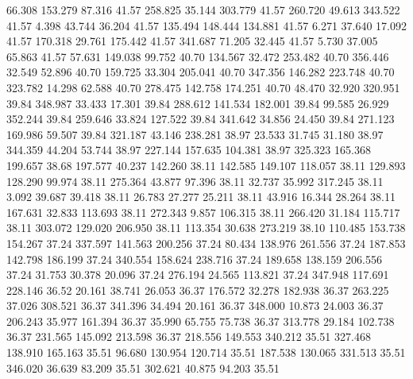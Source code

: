   66.308  153.279   87.316        41.57
 258.825   35.144  303.779        41.57
 260.720   49.613  343.522        41.57
   4.398   43.744   36.204        41.57
 135.494  148.444  134.881        41.57
   6.271   37.640   17.092        41.57
 170.318   29.761  175.442        41.57
 341.687   71.205   32.445        41.57
   5.730   37.005   65.863        41.57
  57.631  149.038   99.752        40.70
 134.567   32.472  253.482        40.70
 356.446   32.549   52.896        40.70
 159.725   33.304  205.041        40.70
 347.356  146.282  223.748        40.70
 323.782   14.298   62.588        40.70
 278.475  142.758  174.251        40.70
  48.470   32.920  320.951        39.84
 348.987   33.433   17.301        39.84
 288.612  141.534  182.001        39.84
  99.585   26.929  352.244        39.84
 259.646   33.824  127.522        39.84
 341.642   34.856   24.450        39.84
 271.123  169.986   59.507        39.84
 321.187   43.146  238.281        38.97
  23.533   31.745   31.180        38.97
 344.359   44.204   53.744        38.97
 227.144  157.635  104.381        38.97
 325.323  165.368  199.657        38.68
 197.577   40.237  142.260        38.11
 142.585  149.107  118.057        38.11
 129.893  128.290   99.974        38.11
 275.364   43.877   97.396        38.11
  32.737   35.992  317.245        38.11
   3.092   39.687   39.418        38.11
  26.783   27.277   25.211        38.11
  43.916   16.344   28.264        38.11
 167.631   32.833  113.693        38.11
 272.343    9.857  106.315        38.11
 266.420   31.184  115.717        38.11
 303.072  129.020  206.950        38.11
 113.354   30.638  273.219        38.10
 110.485  153.738  154.267        37.24
 337.597  141.563  200.256        37.24
  80.434  138.976  261.556        37.24
 187.853  142.798  186.199        37.24
 340.554  158.624  238.716        37.24
 189.658  138.159  206.556        37.24
  31.753   30.378   20.096        37.24
 276.194   24.565  113.821        37.24
 347.948  117.691  228.146        36.52
  20.161   38.741   26.053        36.37
 176.572   32.278  182.938        36.37
 263.225   37.026  308.521        36.37
 341.396   34.494   20.161        36.37
 348.000   10.873   24.003        36.37
 206.243   35.977  161.394        36.37
  35.990   65.755   75.738        36.37
 313.778   29.184  102.738        36.37
 231.565  145.092  213.598        36.37
 218.556  149.553  340.212        35.51
 327.468  138.910  165.163        35.51
  96.680  130.954  120.714        35.51
 187.538  130.065  331.513        35.51
 346.020   36.639   83.209        35.51
 302.621   40.875   94.203        35.51
